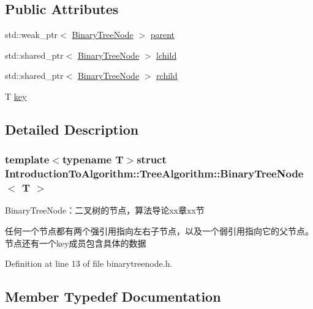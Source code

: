 \subsection*{Public Attributes}
\begin{DoxyCompactItemize}
\item 
std\+::weak\+\_\+ptr$<$ \hyperlink{struct_introduction_to_algorithm_1_1_tree_algorithm_1_1_binary_tree_node}{Binary\+Tree\+Node} $>$ \hyperlink{struct_introduction_to_algorithm_1_1_tree_algorithm_1_1_binary_tree_node_ab0f7e754f706b71943e8453c66485fd4}{parent}
\item 
std\+::shared\+\_\+ptr$<$ \hyperlink{struct_introduction_to_algorithm_1_1_tree_algorithm_1_1_binary_tree_node}{Binary\+Tree\+Node} $>$ \hyperlink{struct_introduction_to_algorithm_1_1_tree_algorithm_1_1_binary_tree_node_a2d776837c806f27641a4128f2f3ebf34}{lchild}
\item 
std\+::shared\+\_\+ptr$<$ \hyperlink{struct_introduction_to_algorithm_1_1_tree_algorithm_1_1_binary_tree_node}{Binary\+Tree\+Node} $>$ \hyperlink{struct_introduction_to_algorithm_1_1_tree_algorithm_1_1_binary_tree_node_a5b0994f31d2ca698326aed39bd6ced65}{rchild}
\item 
T \hyperlink{struct_introduction_to_algorithm_1_1_tree_algorithm_1_1_binary_tree_node_ad0f9224668ce545453577be37c11e99c}{key}
\end{DoxyCompactItemize}


\subsection{Detailed Description}
\subsubsection*{template$<$typename T$>$struct Introduction\+To\+Algorithm\+::\+Tree\+Algorithm\+::\+Binary\+Tree\+Node$<$ T $>$}

Binary\+Tree\+Node：二叉树的节点，算法导论xx章xx节 

任何一个节点都有两个强引用指向左右子节点，以及一个弱引用指向它的父节点。节点还有一个{\ttfamily key}成员包含具体的数据 

Definition at line 13 of file binarytreenode.\+h.



\subsection{Member Typedef Documentation}
\hypertarget{struct_introduction_to_algorithm_1_1_tree_algorithm_1_1_binary_tree_node_a0274d2f034151ffda56a3f466b73f762}{}
